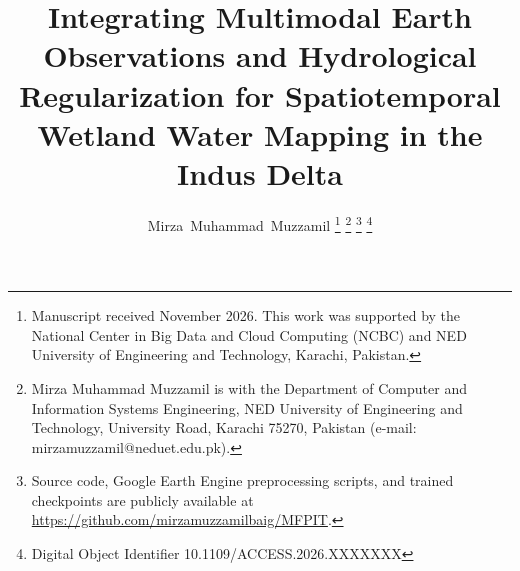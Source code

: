 \documentclass[journal]{IEEEtran}
\begin{document}

\title{Integrating Multimodal Earth Observations and Hydrological Regularization for Spatiotemporal Wetland Water Mapping in the Indus Delta}

\author{Mirza~Muhammad~Muzzamil%
\thanks{Manuscript received November 2026. This work was supported by the National Center in Big Data and Cloud Computing (NCBC) and NED University of Engineering and Technology, Karachi, Pakistan.}%
\thanks{Mirza Muhammad Muzzamil is with the Department of Computer and Information Systems Engineering, NED University of Engineering and Technology, University Road, Karachi 75270, Pakistan (e-mail: mirzamuzzamil@neduet.edu.pk).}%
\thanks{Source code, Google Earth Engine preprocessing scripts, and trained checkpoints are publicly available at \url{https://github.com/mirzamuzzamilbaig/MFPIT}.}%
\thanks{Digital Object Identifier 10.1109/ACCESS.2026.XXXXXXX}}

\maketitle
\end{document}
